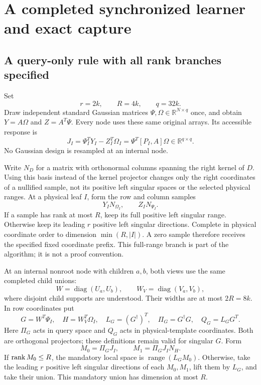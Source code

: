 \documentclass[11pt,oneside,openany,a4paper]{report}
\numberwithin{equation}{chapter}
\theoremstyle{definition}
\theoremstyle{remark}
\newcommand{\R}{\mathbb R}\newcommand{\E}{\mathbb E}\newcommand{\PP}{\mathbb P}\newcommand{\Prb}{\mathbb P}
\DeclareMathOperator{\diag}{diag}\DeclareMathOperator{\range}{range}
\begin{document}
\chapter{A completed synchronized learner and exact capture}
\label{chap:route-synchronized}

\section{A query-only rule with all rank branches specified}

Set
\[
 r=2k,\qquad R=4k,\qquad q=32k.
\]
Draw independent standard Gaussian matrices
$\Psi,\Omega\in\R^{N\times q}$ once, and obtain
$Y=A\Omega$ and $Z=A^T\Psi$.  Every node uses these same original
arrays.  Its accessible response is
\begin{equation}
 J_I=\Psi_I^TY_I-Z_I^T\Omega_I
     =\Psi^T[P_I,A]\Omega\in\R^{q\times q}.
 \label{eq:route-commutator}
\end{equation}
No Gaussian design is resampled at an internal node.

Write $N_D$ for a matrix with orthonormal columns spanning the right
kernel of $D$.  Using this basis instead of the kernel projector changes
only the right coordinates of a nullified sample, not its positive left
singular spaces or the selected physical ranges.  At a physical leaf
$I$, form the row and column samples
\[
 Y_I N_{\Omega_I},\qquad Z_I N_{\Psi_I}.
\]
If a sample has rank at most $R$, keep its full positive left singular
range.  Otherwise keep its leading $r$ positive left singular
directions.  Complete in physical coordinate order to dimension
$\min(R,|I|)$.  A zero sample therefore receives the specified fixed
coordinate prefix.  This full-range branch is part of the algorithm;
it is not a proof convention.

At an internal nonroot node with children $a,b$, both views use the
same completed child unions:
\[
 W=\diag(U_a,U_b),\qquad W_V=\diag(V_a,V_b),
\]
where disjoint child supports are understood.  Their widths are at
most $2R=8k$.  In row coordinates put
\begin{equation}
 G=W^T\Psi_I,\quad H=W_V^T\Omega_I,\quad
 L_G=(G^\dagger)^T,\quad
 \Pi_G=G^\dagger G,\quad Q_G=L_GG^T.
 \label{eq:route-local-design}
\end{equation}
Here $\Pi_G$ acts in query space and $Q_G$ acts in physical-template
coordinates.  Both are orthogonal projectors; these definitions remain
valid for singular $G$.  Form
\[
 M_0=\Pi_GJ_I,\qquad M_1=\Pi_GJ_I N_H.
\]
If $\operatorname{rank} M_0\leq R$, the mandatory local space is
$\range(L_GM_0)$.  Otherwise, take the leading $r$ positive left
singular directions of each $M_0,M_1$, lift them by $L_G$, and take
their union.  This mandatory union has dimension at most $R$.
\end{document}
